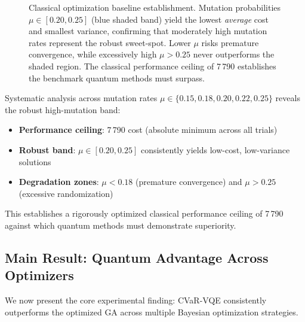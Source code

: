 \begin{figure}[htb]
    \centering
    \caption{Classical optimization baseline establishment. Mutation probabilities $\mu \in [0.20, 0.25]$ (blue shaded band) yield the lowest \emph{average} cost and smallest variance, confirming that moderately high mutation rates represent the robust sweet-spot. Lower $\mu$ risks premature convergence, while excessively high $\mu > 0.25$ never outperforms the shaded region. The classical performance ceiling of 7\,790 establishes the benchmark quantum methods must surpass.}
    \label{fig:ga_mutation}
\end{figure}

Systematic analysis across mutation rates $\mu \in \{0.15, 0.18, 0.20, 0.22, 0.25\}$ reveals the robust high-mutation band:
\begin{itemize}[nosep]
    \item \textbf{Performance ceiling}: 7\,790 cost (absolute minimum across all trials)
    \item \textbf{Robust band}: $\mu \in [0.20, 0.25]$ consistently yields low-cost, low-variance solutions  
    \item \textbf{Degradation zones}: $\mu < 0.18$ (premature convergence) and $\mu > 0.25$ (excessive randomization)
\end{itemize}

This establishes a rigorously optimized classical performance ceiling of 7\,790 against which quantum methods must demonstrate superiority.

\subsection{Main Result: Quantum Advantage Across Optimizers}

We now present the core experimental finding: CVaR-VQE consistently outperforms the optimized GA across multiple Bayesian optimization strategies.


